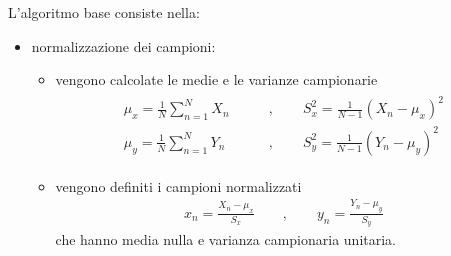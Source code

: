 \documentclass[letterpaper,10pt,italian]{jupyterBook}
\begin{document}
\sphinxAtStartPar
L’algoritmo base consiste nella:
\begin{itemize}
\item {} 
\sphinxAtStartPar
normalizzazione dei campioni:
\begin{itemize}
\item {} 
\sphinxAtStartPar
vengono calcolate le medie e le varianze campionarie
\begin{equation*}
\begin{split}\begin{aligned}
      \mu_x = \frac{1}{N} \sum_{n=1}^N X_n \qquad & , \qquad S^2_x = \frac{1}{N-1} (X_n - \mu_x)^2 \\
      \mu_y = \frac{1}{N} \sum_{n=1}^N Y_n \qquad & , \qquad S^2_y = \frac{1}{N-1} (Y_n - \mu_y)^2
    \end{aligned}\end{split}
\end{equation*}
\item {} 
\sphinxAtStartPar
vengono definiti i campioni normalizzati
\begin{equation*}
\begin{split}x_n = \frac{X_n - \mu_x}{S_x} \qquad , \qquad y_n = \frac{Y_n - \mu_y}{S_y}\end{split}
\end{equation*}
\sphinxAtStartPar
che hanno media nulla e varianza campionaria unitaria.

\end{itemize}


\end{itemize}
\end{document}
